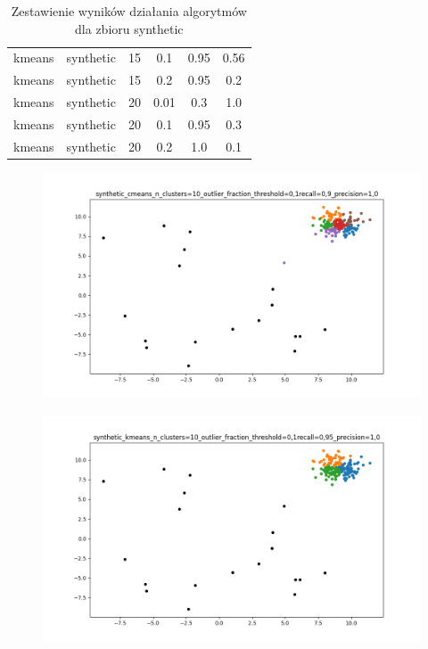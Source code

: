 \documentclass{classrep}
\begin{document}
{{\begin{table}[!htbp]
\begin{tabular}{|c|c|c|c|c|c|}
                    kmeans & synthetic & 15 & 0.1 & 0.95 & 0.56 \\
                    kmeans & synthetic & 15 & 0.2 & 0.95 & 0.2 \\
                    kmeans & synthetic & 20 & 0.01 & 0.3 & 1.0 \\
                    kmeans & synthetic & 20 & 0.1 & 0.95 & 0.3 \\
                    kmeans & synthetic & 20 & 0.2 & 1.0 & 0.1 \\ \hline
                \end{tabular}
                \caption
                {Zestawienie wyników działania algorytmów dla zbioru synthetic}
                \label{tab:synth}
            \end{table}

            \begin{figure}[!htbp]
                \centering
                \includegraphics[width=\textwidth]{img/synthetic_cmeans_n_clusters=10_outlier_fraction_threshold=0,1-182007.png}
                \caption{}
                \label{fig:synth_cmeans}
            \end{figure}

            \begin{figure}[!htbp]
                \centering
                \includegraphics[width=\textwidth]{img/synthetic_kmeans_n_clusters=10_outlier_fraction_threshold=0,1-182011.png}
                \caption{}
                \label{fig:synth_kmeans}
            \end{figure}
            \FloatBarrier
        }

}
\end{document}

